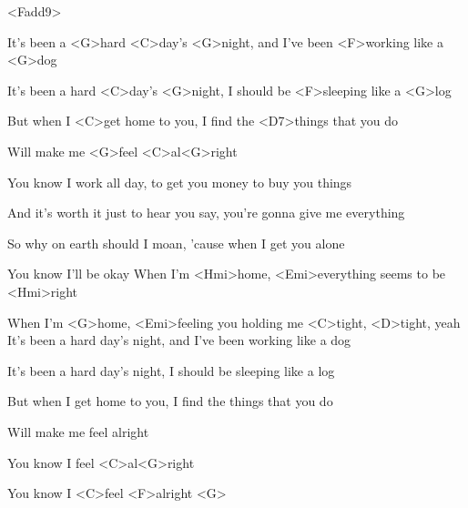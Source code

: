 

<Fadd9>

\zs

It's been a <G>hard <C>day's <G>night, and I've been <F>working like a <G>dog

It's been a hard <C>day's <G>night, I should be <F>sleeping like a <G>log

But when I <C>get home to you, I find the <D7>things that you do

Will make me <G>feel <C>al<G>right
\ks
\zs

You know I work all day, to get you money to buy you things

And it's worth it just to hear you say, you're gonna give me everything

So why on earth should I moan, 'cause when I get you alone

You know I'll be okay
\ks
\zr
When I'm <Hmi>home, <Emi>everything seems to be <Hmi>right

When I'm <G>home, <Emi>feeling you holding me <C>tight, <D>tight, yeah
\kr
\zs
It's been a hard day's night, and I've been working like a dog

It's been a hard day's night, I should be sleeping like a log

But when I get home to you, I find the things that you do

Will make me feel alright

You know I feel <C>al<G>right

You know I <C>feel <F>alright <G> 
\ks
\kp

